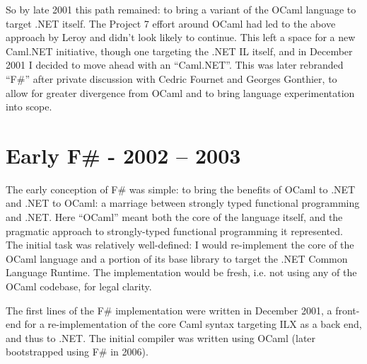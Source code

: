 \documentclass[acmsmall,review]{acmart}\settopmatter{printfolios=true,printccs=false,printacmref=false}
\begin{document}
So by late 2001 this path remained: to bring a variant of the OCaml language to target .NET itself. The Project 7 effort around OCaml had led to the above approach by Leroy and didn’t look likely to continue.  This left a space for a new Caml.NET initiative, though one targeting the .NET IL itself, and in December 2001 I decided to move ahead with an “Caml.NET”. This was later rebranded “F\#” after private discussion with Cedric Fournet and Georges Gonthier, to allow for greater divergence from OCaml and to bring language experimentation into scope.   


\section*{Early F\# - 2002 – 2003}

The early conception of F\# was simple: to bring the benefits of OCaml to .NET and .NET to OCaml: a marriage between strongly typed functional programming and .NET.  Here “OCaml” meant both the core of the language itself, and the pragmatic approach to strongly-typed functional programming it represented. The initial task was relatively well-defined: I would re-implement the core of the OCaml language and a portion of its base library to target the .NET Common Language Runtime. The implementation would be fresh, i.e. not using any of the OCaml codebase, for legal clarity. 

The first lines of the F\# implementation were written in December 2001, a front-end for a re-implementation of the core Caml syntax targeting ILX as a back end, and thus to .NET. The initial compiler was written using OCaml (later bootstrapped using F\# in 2006). 
\end{document}
